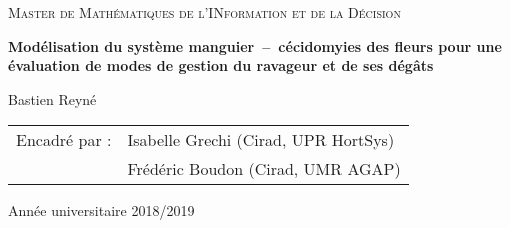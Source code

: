 
\begin{titlingpage}


\vspace*{2.5cm}

\begin{center}
 
 {\large \textsc{Master de Mathématiques de l'INformation et de la Décision}}


 \vspace*{2cm}
 
 
 {\Large \textbf{Modélisation du système manguier~--~cécidomyies des fleurs pour une évaluation de modes de gestion du ravageur et de ses dégâts}}
 \vspace*{1cm}
 
 Bastien Reyné
 
\end{center}

\vspace*{2cm}

\noindent
\begin{tabular}{ll}
Encadré par : & Isabelle Grechi (Cirad, UPR HortSys)\\
 & Frédéric Boudon (Cirad, UMR AGAP)
\end{tabular}

\vspace*{2cm}

\begin{center}
\end{center}



\vfill

\begin{center}
 Année universitaire 2018/2019
\end{center}


\end{titlingpage}
